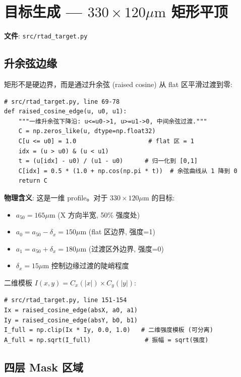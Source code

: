 \documentclass[11pt,a4paper]{ctexart}
\begin{document}
\section{目标生成 — $330\times120\mu\text{m}$ 矩形平顶}

\textbf{文件}: \texttt{src/rtad\_target.py}

\subsection{升余弦边缘}

矩形不是硬边界，而是通过升余弦 (raised cosine) 从 flat 区平滑过渡到零:

\begin{lstlisting}
# src/rtad_target.py, line 69-78
def raised_cosine_edge(u, u0, u1):
    """一维升余弦下降沿: u<=u0->1, u>=u1->0, 中间余弦过渡."""
    C = np.zeros_like(u, dtype=np.float32)
    C[u <= u0] = 1.0                    # flat 区 = 1
    idx = (u > u0) & (u < u1)
    t = (u[idx] - u0) / (u1 - u0)      # 归一化到 [0,1]
    C[idx] = 0.5 * (1.0 + np.cos(np.pi * t))  # 余弦曲线从 1 降到 0
    return C
\end{lstlisting}

\textbf{物理含义}: 这是一维 profile。对于 $330\times120\mu\text{m}$ 的目标:
\begin{itemize}[nosep]
  \item $a_{50} = 165\mu\text{m}$ (X 方向半宽, 50\% 强度处)
  \item $a_0 = a_{50} - \delta_x = 150\mu\text{m}$ (flat 区边界, 强度=1)
  \item $a_1 = a_{50} + \delta_x = 180\mu\text{m}$ (过渡区外边界, 强度=0)
  \item $\delta_x = 15\mu\text{m}$ 控制边缘过渡的陡峭程度
\end{itemize}

二维模板 $I(x,y) = C_x(|x|) \times C_y(|y|)$:

\begin{lstlisting}
# src/rtad_target.py, line 151-154
Ix = raised_cosine_edge(absX, a0, a1)
Iy = raised_cosine_edge(absY, b0, b1)
I_full = np.clip(Ix * Iy, 0.0, 1.0)   # 二维强度模板 (可分离)
A_full = np.sqrt(I_full)               # 振幅 = sqrt(强度)
\end{lstlisting}

\subsection{四层 Mask 区域}
\end{document}
